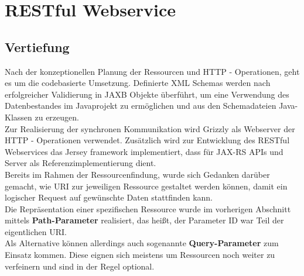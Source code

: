 
\section{RESTful Webservice}

\subsection{Vertiefung}

Nach der konzeptionellen Planung der Ressourcen und HTTP - Operationen, geht es um die codebasierte Umsetzung. Definierte XML Schemas werden nach erfolgreicher Validierung in JAXB Objekte überführt, um eine Verwendung des Datenbestandes im Javaprojekt zu ermöglichen und aus den Schemadateien Java-Klassen zu erzeugen.\\
Zur Realisierung der synchronen Kommunikation wird Grizzly als Webserver der HTTP - Operationen verwendet. Zusätzlich wird zur Entwicklung des RESTful Webservices das Jersey framework implementiert, dass für JAX-RS APIs und Server als Referenzimplementierung dient.\\
\vspace{0.2cm}
Bereits im Rahmen der Ressourcenfindung, wurde sich Gedanken darüber gemacht, wie URI zur jeweiligen Ressource gestaltet werden können, damit ein logischer Request auf gewünschte Daten stattfinden kann.\\
Die Repräsentation einer spezifischen Ressource wurde im vorherigen Abschnitt mittels \textbf{Path-Parameter} realisiert, das heißt, der Parameter ID war Teil der eigentlichen URI.\\
Als Alternative können allerdings auch sogenannte \textbf{Query-Parameter} zum Einsatz kommen. Diese eignen sich meistens um Ressourcen noch weiter zu verfeinern und sind in der Regel optional.\\

